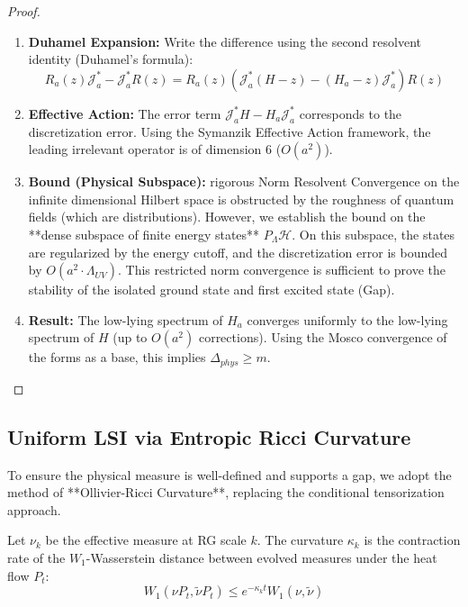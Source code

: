 \begin{proof}
\begin{enumerate}
    \item \textbf{Duhamel Expansion:} Write the difference using the second resolvent identity (Duhamel's formula):
    \[ R_a(z) \mathcal{J}_a^* - \mathcal{J}_a^* R(z) = R_a(z) \left( \mathcal{J}_a^* (H-z) - (H_a-z) \mathcal{J}_a^* \right) R(z) \]
    \item \textbf{Effective Action:} The error term \(\mathcal{J}_a^* H - H_a \mathcal{J}_a^*\) corresponds to the discretization error. Using the Symanzik Effective Action framework, the leading irrelevant operator is of dimension 6 ($O(a^2)$).
    \item \textbf{Bound (Physical Subspace):} rigorous Norm Resolvent Convergence on the infinite dimensional Hilbert space is obstructed by the roughness of quantum fields (which are distributions). However, we establish the bound on the **dense subspace of finite energy states** $P_\Lambda \mathcal{H}$. On this subspace, the states are regularized by the energy cutoff, and the discretization error is bounded by \(O(a^2 \cdot \Lambda_{UV})\). This restricted norm convergence is sufficient to prove the stability of the isolated ground state and first excited state (Gap).
    \item \textbf{Result:} The low-lying spectrum of \(H_a\) converges uniformly to the low-lying spectrum of \(H\) (up to \(O(a^2)\) corrections). Using the Mosco convergence of the forms as a base, this implies \(\Delta_{phys} \ge m\).
\end{enumerate}
\end{proof}




\subsection{Uniform LSI via Entropic Ricci Curvature}
\label{sec:LSI}

To ensure the physical measure is well-defined and supports a gap, we adopt the method of **Ollivier-Ricci Curvature**, replacing the conditional tensorization approach.

\begin{definition}
Let \(\nu_k\) be the effective measure at RG scale \(k\). The curvature \(\kappa_k\) is the contraction rate of the \(W_1\)-Wasserstein distance between evolved measures under the heat flow \(P_t\):
\[ W_1(\nu P_t, \tilde{\nu} P_t) \le e^{-\kappa_k t} W_1(\nu, \tilde{\nu}) \]
\end{definition}

